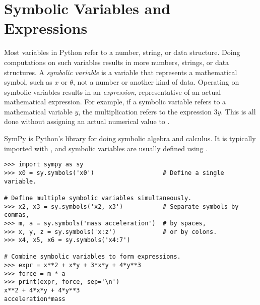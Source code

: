 

\section*{Symbolic Variables and Expressions} %

Most variables in Python refer to a number, string, or data structure.
Doing computations on such variables results in more numbers, strings, or data structures.
A \emph{symbolic variable} is a variable that represents a mathematical symbol, such as $x$ or $\theta$, not a number or another kind of data.
Operating on symbolic variables results in an \emph{expression}, representative of an actual mathematical expression.
For example, if a symbolic variable  refers to a mathematical variable $y$, the multiplication  refers to the expression $3y$.
This is all done without assigning an actual numerical value to .

SymPy \cite{meurer2017sympy} is Python's library for doing symbolic algebra and calculus.
It is typically imported with , and symbolic variables are usually defined using .

\begin{lstlisting}
>>> import sympy as sy
>>> x0 = sy.symbols('x0')                   # Define a single variable.

# Define multiple symbolic variables simultaneously.
>>> x2, x3 = sy.symbols('x2, x3')           # Separate symbols by commas,
>>> m, a = sy.symbols('mass acceleration')  # by spaces,
>>> x, y, z = sy.symbols('x:z')             # or by colons.
>>> x4, x5, x6 = sy.symbols('x4:7')

# Combine symbolic variables to form expressions.
>>> expr = x**2 + x*y + 3*x*y + 4*y**3
>>> force = m * a
>>> print(expr, force, sep='\n')
x**2 + 4*x*y + 4*y**3
acceleration*mass
\end{lstlisting}
%


